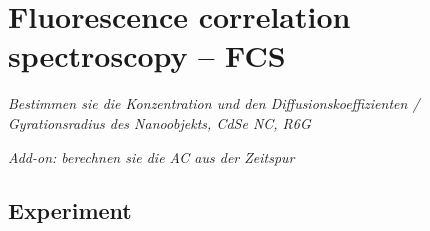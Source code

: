 

\chapter{Fluorescence correlation spectroscopy -- FCS}


\textit{Bestimmen sie die Konzentration und den Diffusionskoeffizienten / Gyrationsradius des Nanoobjekts, CdSe NC, R6G}


\textit{Add-on: berechnen sie die AC aus der Zeitspur}


\section{Experiment}






\printbibliography[segment=\therefsegment,heading=subbibliography]
